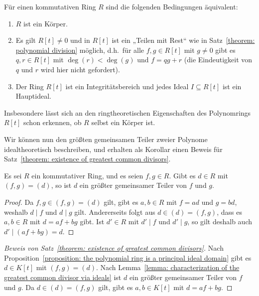 \begin{remark}
  Für einen kommutativen Ring $R$ sind die folgenden Bedingungen äquivalent:
  \begin{enumerate}
    \item
      $R$ ist ein Körper.
    \item
      Es gilt $R[t] \neq 0$ und in $R[t]$ ist ein „Teilen mit Rest“ wie in Satz~\ref{theorem: polynomial division} möglich, d.h.\ für alle $f, g \in R[t]$ mit $g \neq 0$ gibt es $q, r \in R[t]$ mit $\deg(r) < \deg(g)$ und $f = q g + r$ (die Eindeutigkeit von $q$ und $r$ wird hier nicht gefordert).
    \item
      Der Ring $R[t]$ ist ein Integritätsbereich und jedes Ideal $I \subseteq R[t]$ ist ein Hauptideal.
  \end{enumerate}
  Insbesondere lässt sich an den ringtheoretischen Eigenschaften des Polynomrings $R[t]$ schon erkennen, ob $R$ selbst ein Körper ist.
\end{remark}

Wir können nun den größten gemeinsamen Teiler zweier Polynome idealtheoretisch beschreiben, und erhalten als Korollar einen Beweis für Satz~\ref{theorem: existence of greatest common divisors}.

\begin{lemma}
  \label{lemma: characterization of the greatest common divisor via ideals}
  Es sei $R$ ein kommutativer Ring, und es seien $f, g \in R$.
  Gibt es $d \in R$ mit $(f, g ) = (d)$, so ist $d$ ein größter gemeinsamer Teiler von $f$ und $g$.
\end{lemma}

\begin{proof}
  Da $f, g \in (f,g) = (d)$ gilt, gibt es $a, b \in R$ mit $f = ad$ und $g = bd$, weshalb $d \mid f$ und $d \mid g$ gilt.
  Andererseits folgt aus $d \in (d) = (f,g)$, dass es $a, b \in R$ mit $d = af + bg$ gibt.
  Ist $d' \in R$ mit $d' \mid f$ und $d' \mid g$, so gilt deshalb auch $d' \mid (af + bg) = d$.
\end{proof}

\begin{proof}[Beweis von Satz~\ref{theorem: existence of greatest common divisors}]
  Nach Proposition~\ref{proposition: the polynomial ring is a principal ideal domain} gibt es $d \in K[t]$ mit $(f,g) = (d)$.
  Nach Lemma~\ref{lemma: characterization of the greatest common divisor via ideals} ist $d$ ein größter gemeinsamer Teiler von $f$ und $g$.
  Da $d \in (d) = (f,g)$ gilt, gibt es $a, b \in K[t]$ mit $d = af + bg$.
\end{proof}


